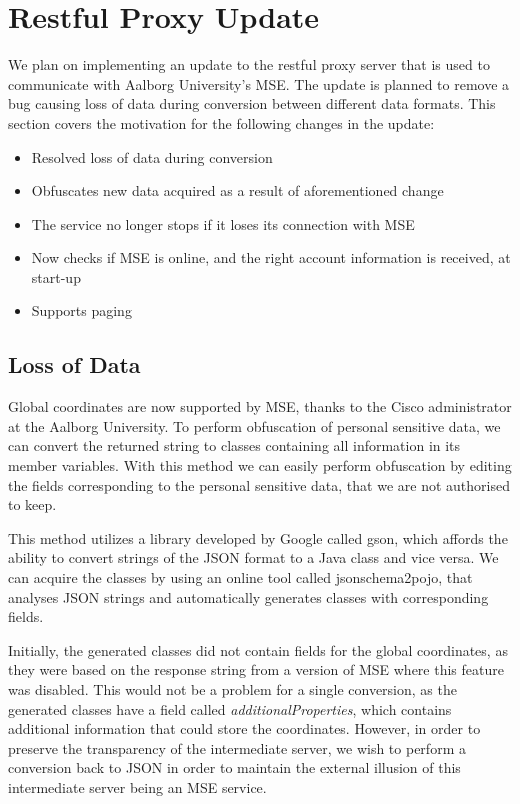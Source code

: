 \section{Restful Proxy Update}\label{sec:proxy_update1}
We plan on implementing an update to the restful proxy server that is used to communicate with Aalborg University's MSE. The update is planned to remove a bug causing loss of data during conversion between different data formats. This section covers the motivation for the following changes in the update:

\begin{itemize}
\item Resolved loss of data during conversion
\item Obfuscates new data acquired as a result of aforementioned change
\item The service no longer stops if it loses its connection with MSE
\item Now checks if MSE is online, and the right account information is received, at start-up
\item Supports paging
\end{itemize}

\subsection{Loss of Data}
Global coordinates are now supported by MSE, thanks to the Cisco administrator at the Aalborg University. To perform obfuscation of personal sensitive data, we can convert the returned string to classes containing all information in its member variables. With this method we can easily perform obfuscation by editing the fields corresponding to the personal sensitive data, that we are not authorised to keep.

This method utilizes a library developed by Google called gson\cite{gson}, which affords the ability to convert strings of the JSON format to a Java class and vice versa. We can acquire the classes by using an online tool called jsonschema2pojo\cite{jsonschematwopojo}, that analyses JSON strings and automatically generates classes with corresponding fields.

Initially, the generated classes did not contain fields for the global coordinates, as they were based on the response string from a version of MSE where this feature was disabled. This would not be a problem for a single conversion, as the generated classes have a field called \textit{additionalProperties}, which contains additional information that could store the coordinates. However, in order to preserve the transparency of the intermediate server, we wish to perform a conversion back to JSON in order to maintain the external illusion of this intermediate server being an MSE service.


